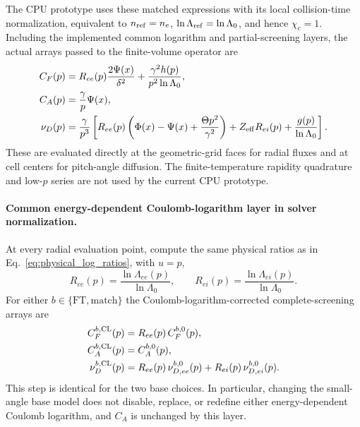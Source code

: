 \documentclass[11pt]{article}
\begin{document}
The CPU prototype uses these matched expressions with its local collision-time
normalization, equivalent to $n_{\rm ref}=n_e$, $\ln\Lambda_{\rm ref}=\ln\Lambda_0$,
and hence $\chi_c=1$.  Including the implemented common logarithm and partial-screening
layers, the actual arrays passed to the finite-volume operator are
\begin{align}
 C_F(p)&=R_{ee}(p)\frac{2\Psi(x)}{\delta^2}
       +\frac{\gamma^2h(p)}{p^2\ln\Lambda_0},\\
 C_A(p)&=\frac{\gamma}{p}\Psi(x),\\
 \nu_D(p)&=\frac{\gamma}{p^3}\left[
 R_{ee}(p)\left(\Phi(x)-\Psi(x)+\frac{\Theta p^2}{\gamma^2}\right)
 +Z_{\rm eff}R_{ei}(p)+\frac{g(p)}{\ln\Lambda_0}\right].
 \label{eq:cpu_matched_final_coefficients}
\end{align}
These are evaluated directly at the geometric-grid faces for radial fluxes and at cell
centers for pitch-angle diffusion.  The finite-temperature rapidity quadrature and
low-$p$ series are not used by the current CPU prototype.

\paragraph{Common energy-dependent Coulomb-logarithm layer in solver normalization.}
At every radial evaluation point, compute the same physical ratios as in
Eq.~\eqref{eq:physical_log_ratios}, with $u=p$,
\begin{equation}
 R_{ee}(p)=\frac{\ln\Lambda_{ee}(p)}{\ln\Lambda_0},
 \qquad
 R_{ei}(p)=\frac{\ln\Lambda_{ei}(p)}{\ln\Lambda_0}.
 \label{eq:numeric_log_ratios}
\end{equation}
For either $b\in\{\mathrm{FT},\mathrm{match}\}$ the Coulomb-logarithm-corrected
complete-screening arrays are
\begin{align}
 C_F^{b,\rm CL}(p)
 &=R_{ee}(p)\,C_F^{b,0}(p),
 \label{eq:common_log_numeric_cf}\\
 C_A^{b,\rm CL}(p)
 &=C_A^{b,0}(p),
 \label{eq:common_log_numeric_ca}\\
 \nu_D^{b,\rm CL}(p)
 &=R_{ee}(p)\,\nu_{D,ee}^{b,0}(p)
  +R_{ei}(p)\,\nu_{D,ei}^{b,0}(p).
 \label{eq:common_log_numeric_nud}
\end{align}
This step is identical for the two base choices.  In particular, changing the small-angle
base model does not disable, replace, or redefine either energy-dependent Coulomb
logarithm, and $C_A$ is unchanged by this layer.
\end{document}
